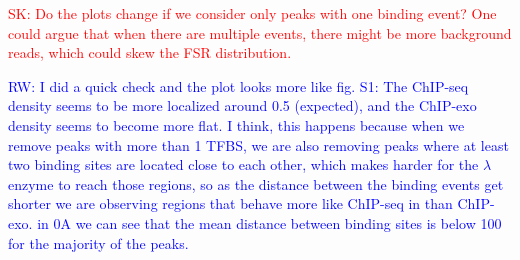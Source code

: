 \documentclass{bmcart}
\newcommand{\SK}[1]{\textcolor{red}{SK: #1}}
\newcommand{\RW}[1]{\textcolor{blue}{RW: #1}}
\begin{document}

\SK{Do the plots change if we consider only peaks with one binding
  event? One could argue that when there are multiple events, there
  might be more background reads, which could skew the FSR
  distribution.}

\RW{I did a quick check and the plot looks more like fig. S1: The
  ChIP-seq density seems to be more localized around 0.5 (expected),
  and the ChIP-exo density seems to become more flat. I think, this
  happens because when we remove peaks with more than 1 TFBS, we are
  also removing peaks where at least two binding sites are located
  close to each other, which makes harder for the $\lambda$ enzyme to
  reach those regions, so as the distance between the binding events
  get shorter we are observing regions that behave more like ChIP-seq
  in than ChIP-exo. in 0A we can see that the mean distance
  between binding sites is below 100 for the majority of the peaks.}




\end{document}
